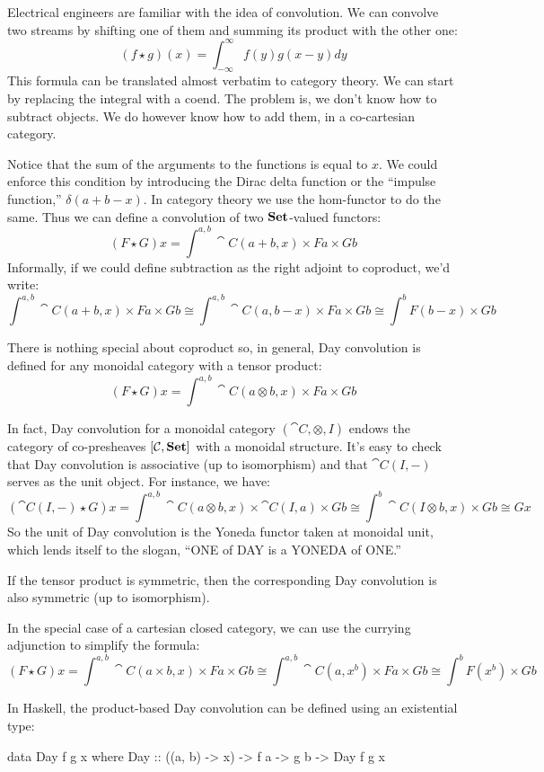 \documentclass[DaoFP]{subfiles}
\begin{document}
Electrical engineers are familiar with the idea of convolution. We can convolve two streams by shifting one of them and summing its product with the other one: 
\[ (f \star g)(x) = \int^{\infty}_{-\infty} f(y) g(x - y) dy \]
This formula can be translated almost verbatim to category theory. We can start by replacing the integral with a coend. The problem is, we don't know how to subtract objects. We do however know how to add them, in a co-cartesian category. 

Notice that the sum of the arguments to the functions is equal to $x$. We could enforce this condition by introducing the Dirac delta function or the ``impulse function,'' $\delta(a + b - x)$. In category theory we use the hom-functor to do the same. Thus we can define a convolution of two $\mathbf{Set}$-valued functors:
\[ (F \star G) x = \int^{a, b} \cat C (a + b, x) \times F a \times G b \]
Informally, if we could define subtraction as the right adjoint to coproduct, we'd write:
\[ \int^{a, b} \cat C (a + b, x) \times F a \times G b \cong \int^{a, b} \cat C (a, b - x) \times F a \times G b \cong \int^b F (b - x) \times G b\]

There is nothing special about coproduct so, in general, Day convolution is defined for any monoidal category with a tensor product:
\[ (F \star G) x = \int^{a, b} \cat C (a \otimes b, x) \times F a \times G b \]

In fact, Day convolution for a monoidal category $(\cat C, \otimes, I)$ endows the category of co-presheaves $[\mathcal{C}, \mathbf{Set}]$ with a monoidal structure. It's easy to check that Day convolution is associative (up to isomorphism) and that $\cat C(I, -)$ serves as the unit object. For instance, we have:
\[ (\cat C(I, -) \star G) x =  \int^{a, b} \cat C (a \otimes b, x) \times \cat C(I, a) \times G b \cong 
  \int^{b} \cat C (I \otimes b, x) \times  G b \cong G x\]
So the unit of Day convolution is the Yoneda functor taken at monoidal unit, which lends itself to the slogan, ``ONE of DAY is a YONEDA of ONE.''

If the tensor product is symmetric, then the corresponding Day convolution is also symmetric (up to isomorphism).

In the special case of a cartesian closed category, we can use the currying adjunction to simplify the formula:
\[ (F \star G) x = \int^{a, b} \cat C (a \times b, x) \times F a \times G b \cong  \int^{a, b} \cat C (a, x^b) \times F a \times G b \cong  \int^{b}  F (x^b) \times G b\]

In Haskell, the product-based Day convolution can be defined using an existential type:
\begin{haskell}
data Day f g x where
  Day :: ((a, b) -> x) -> f a -> g b -> Day f g x
\end{haskell}
\end{document}
